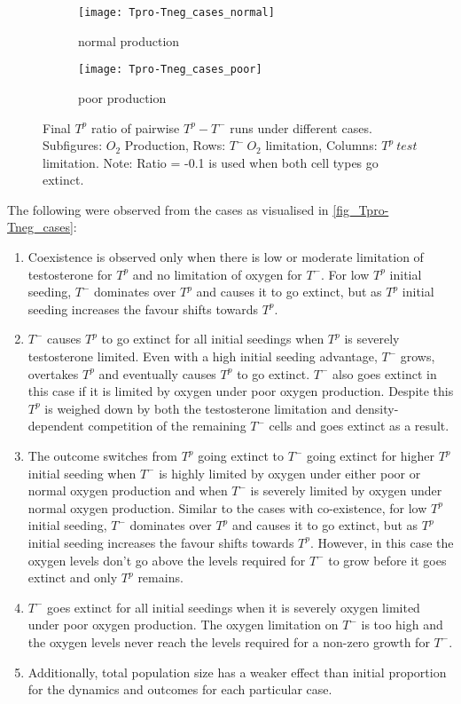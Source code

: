 \begin{figure}[h!]
  \centering
  \begin{subfigure}[b]{\textwidth}
    \centering
    \texttt{[image: Tpro-Tneg\_cases\_normal]}
    \caption{normal production}
    \label{fig_Tpro-Tneg_cases_normal}
  \end{subfigure}
  \begin{subfigure}[b]{\textwidth}
    \centering
    \texttt{[image: Tpro-Tneg\_cases\_poor]}
    \caption{poor production}
    \label{fig_Tpro-Tneg_cases_poor}
  \end{subfigure}
  \caption[Final $T^p$ ratio of pairwise $T^p - T^-$ runs under different cases]{Final $T^p$ ratio of pairwise $T^p - T^-$ runs under different cases. Subfigures: $O_2$ Production, Rows: $T^-\ O_2$ limitation, Columns: $T^p\ test$ limitation. Note: Ratio = -0.1 is used when both cell types go extinct.}
  \label{fig_Tpro-Tneg_cases}
\end{figure}

\newpage
The following were observed from the cases as visualised in \autoref{fig_Tpro-Tneg_cases}:
\begin{enumerate}
  \item Coexistence is observed only when there is low or moderate limitation of testosterone for $T^p$ and no limitation of oxygen for $T^-$. For low $T^p$ initial seeding, $T^-$ dominates over $T^p$ and causes it to go extinct, but as $T^p$ initial seeding increases the favour shifts towards $T^p$.
  \item $T^-$ causes $T^p$ to go extinct for all initial seedings when $T^p$ is severely testosterone limited. Even with a high initial seeding advantage, $T^-$ grows, overtakes $T^p$ and eventually causes $T^p$ to go extinct. $T^-$ also goes extinct in this case if it is limited by oxygen under poor oxygen production. Despite this $T^p$ is weighed down by both the testosterone limitation and density-dependent competition of the remaining $T^-$ cells and goes extinct as a result.
  \item The outcome switches from $T^p$ going extinct to $T^-$ going extinct for higher $T^p$ initial seeding when $T^-$ is highly limited by oxygen under either poor or normal oxygen production and when $T^-$ is severely limited by oxygen under normal oxygen production. Similar to the cases with co-existence, for low $T^p$ initial seeding, $T^-$ dominates over $T^p$ and causes it to go extinct, but as $T^p$ initial seeding increases the favour shifts towards $T^p$. However, in this case the oxygen levels don't go above the levels required for $T^-$ to grow before it goes extinct and only $T^p$ remains.
  \item $T^-$ goes extinct for all initial seedings when it is severely oxygen limited under poor oxygen production. The oxygen limitation on $T^-$ is too high and the oxygen levels never reach the levels required for a non-zero growth for $T^-$.
  \item Additionally, total population size has a weaker effect than initial proportion for the dynamics and outcomes for each particular case.
\end{enumerate}

